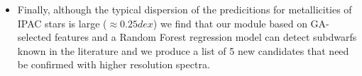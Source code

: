 \begin{itemize}
\item Finally, although the typical dispersion of the predicitions for metallicities of IPAC stars is large ($\approx 0.25 dex$) we find that our module based on GA-selected features and a Random Forest regression model can detect subdwarfs known in the literature and we produce a list of 5 new candidates that need be confirmed with higher resolution spectra.  

\end{itemize}


